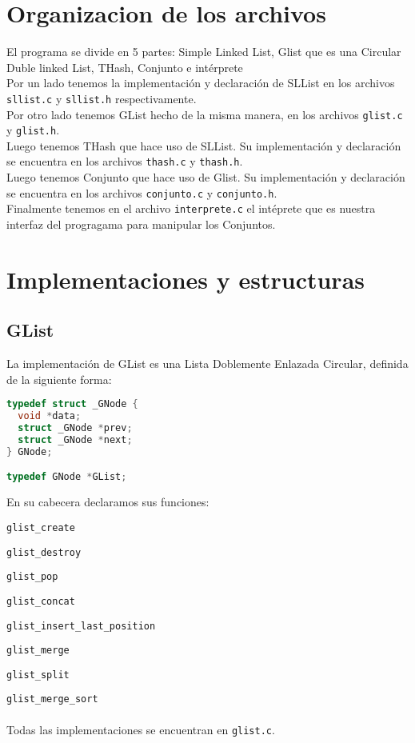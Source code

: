 \documentclass[]{article}
\begin{document}
\section{Organizacion de los archivos}
El programa se divide en 5 partes: Simple Linked List, Glist que es una Circular Duble linked List, THash, Conjunto e intérprete\\
Por un lado tenemos la implementación y declaración de SLList en los archivos \verb|sllist.c| y \verb|sllist.h| respectivamente.\\
Por otro lado tenemos GList hecho de la misma manera, en los archivos \verb|glist.c| y \verb|glist.h|.\\
Luego tenemos THash que hace uso de SLList. Su implementación y declaración se encuentra en los archivos \verb|thash.c| y \verb|thash.h|.\\
Luego tenemos Conjunto que hace uso de Glist. Su implementación y declaración se encuentra en los archivos \verb|conjunto.c| y \verb|conjunto.h|.\\
Finalmente tenemos en el archivo \verb|interprete.c| el intéprete que es nuestra interfaz del progragama para manipular los Conjuntos.
\newpage
\section{Implementaciones y estructuras}
\subsection{GList}
La implementación de GList es una Lista Doblemente Enlazada Circular, definida de la siguiente forma:

\begin{lstlisting}[language=C]
typedef struct _GNode {
  void *data;
  struct _GNode *prev;
  struct _GNode *next;
} GNode;

typedef GNode *GList;
\end{lstlisting}
En su cabecera declaramos sus funciones:

\verb|glist_create|

\verb|glist_destroy|

\verb|glist_pop|

\verb|glist_concat|

\verb|glist_insert_last_position|

\verb|glist_merge|

\verb|glist_split|

\verb|glist_merge_sort|
\\\\
Todas las implementaciones se encuentran en \verb|glist.c|.
\end{document}
